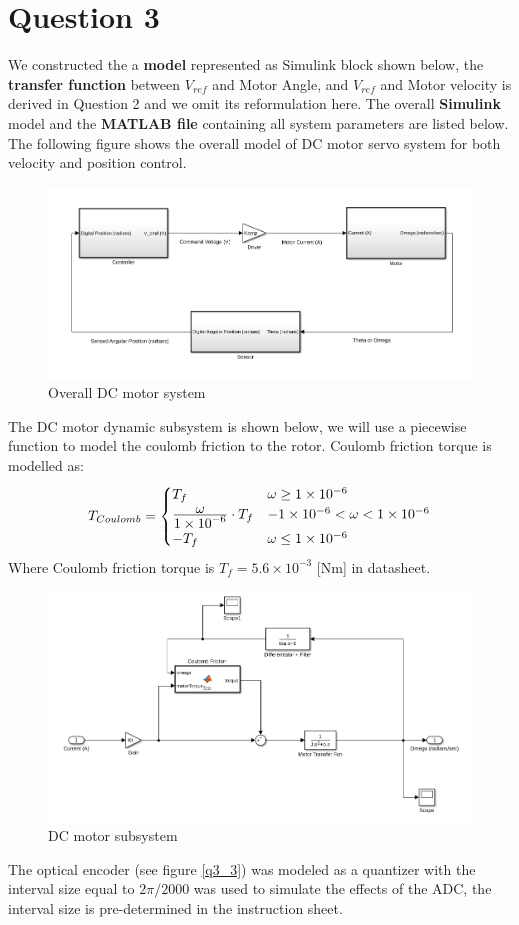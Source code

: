 \documentclass[letterpaper]{article}
\begin{document}
\section*{Question 3}
We constructed the a \textbf{model} represented as Simulink block shown below, the \textbf{transfer function} between $V_{ref}$ and Motor Angle, and $V_{ref}$ and Motor velocity is derived in Question 2 and we omit its reformulation here. The overall \textbf{Simulink} model and the \textbf{MATLAB file} containing all system parameters are listed below.
The following figure shows the overall model of DC motor servo system for both velocity and position control.
\begin{figure}[H]
	\centering
	\includegraphics[scale=0.36]{motorServoSystem.png}
	\caption{Overall DC motor system}
	\label{q3_1}
\end{figure}
The DC motor dynamic subsystem is shown below, we will use a piecewise function to model the coulomb friction to the rotor. Coulomb friction torque is modelled as:
\[T_{Coulomb} = \begin{cases} 
      T_f & \omega\geq 1\times10^{-6} \\
      \frac{\displaystyle \omega}{\displaystyle 1\times 10^{-6}}\cdot T_f & -1\times 10^{-6} < \omega < 1\times 10^{-6} \\
      -T_f & \omega \leq 1\times 10^{-6} 
   \end{cases}
\]
Where Coulomb friction torque is $T_f = 5.6\times 10^{-3}$ [Nm] in datasheet.
\begin{figure}[H]
	\centering
	\includegraphics[scale=0.4]{motorSubsystem.png}
	\caption{DC motor subsystem}
	\label{q3_2}
\end{figure}
The optical encoder (see figure \ref{q3_3}) was modeled as a quantizer with the interval size equal to $2\pi/2000$ was used to simulate the effects of the ADC, the interval size is pre-determined in the instruction sheet.
\end{document}

